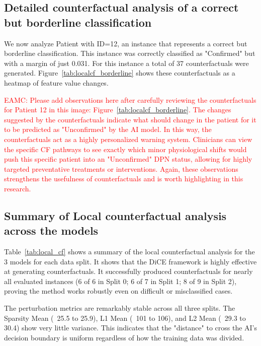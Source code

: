 \documentclass[fleqn,10pt]{wlscirep}
\begin{document}
    
\subsection*{Detailed counterfactual analysis of a correct but borderline classification}
\label{ssec:cf_borderline}
 We now analyze Patient with ID=12, an instance that represents a correct but borderline classification. This instance was correctly classified as "Confirmed" but with a margin of just 0.031. For this instance a total of 37 counterfactuals were generated. Figure~\ref{tab:localcf_borderline} shows these counterfactuals as a heatmap of feature value changes. 
   
\textcolor{red}{EAMC: Please add observations here after carefully reviewing the counterfactuals for Patient 12 in this image: Figure~\ref{tab:localcf_borderline}. The changes suggested by the counterfactuals indicate what should change in the patient for it to be predicted as "Unconfirmed" by the AI model. In this way, the counterfactuals act as a highly personalized warning system. Clinicians can view the specific CF pathways to see exactly which minor physiological shifts would push this specific patient into an "Unconfirmed" DPN status, allowing for highly targeted preventative treatments or interventions. Again, these observations strengthens the usefulness of counterfactuals and is worth highlighting in this research.}

\subsection*{Summary of Local counterfactual analysis across the models}
Table~\ref{tab:local_cf} shows a summary of the local counterfactual analysis for the 3 models for each data split. It shows that the DiCE framework is highly effective at generating counterfactuals. It successfully produced counterfactuals for nearly all evaluated instances (6 of 6 in Split 0; 6 of 7 in Split 1; 8 of 9 in Split 2), proving the method works robustly even on difficult or misclassified cases. 

The perturbation metrics are remarkably stable across all three splits. The Sparsity Mean (~25.5 to 25.9), L1 Mean (~101 to 106), and L2 Mean (~29.3 to 30.4) show very little variance. This indicates that the "distance" to cross the AI's decision boundary is uniform regardless of how the training data was divided. 
\end{document}
